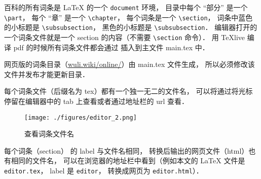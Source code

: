 百科的所有词条是 LaTeX 的一个 \verb|document| 环境， 目录中每个 “部分” 是一个 \verb|\part|， 每个 “章” 是一个 \verb|\chapter|， 每个词条是一个 \verb|\section|， 词条中蓝色的小标题是 \verb|\subsubsection|， 黑色的小标题是 \verb|\subsubsection|． 编辑器打开的一个词条文件就是一个 section 的内容（不需要 \verb|\section| 命令）． 用 TeXlive 编译 pdf 的时候所有词条文件都会通过 \verb|| 插入到主文件 main.tex 中．

网页版的词条目录（\href{https://wuli.wiki/online/}{wuli.wiki/online/}）由 main.tex 文件生成， 所以必须修改该文件并发布才能更新目录．

每个词条文件（后缀名为 tex）都有一个独一无二的文件名， 可以将通过将光标停留在编辑器中的 tab 上查看或者通过地址栏的 url 查看．

\begin{figure}[ht]
\centering
\texttt{[image: ./figures/editor\_2.png]}
\caption{查看词条文件名} \label{editor_fig2}
\end{figure}

每个词条（section） 的 label 与文件名相同， 转换后输出的网页文件（html）也有相同的文件名， 可以在浏览器的地址栏中看到（例如本文的 LaTeX 文件是 \verb|editor.tex|， label 是 \verb|editor|， 转换成网页为 \verb|editor.html|）．

